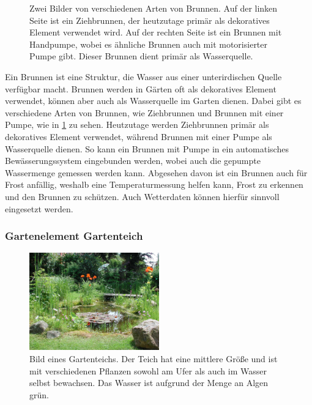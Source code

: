 \begin{figure}[!htb]
	\caption[Bilder von verschiedenen Arten von Brunnen.]{
		Zwei Bilder von verschiedenen Arten von Brunnen.
		Auf der linken Seite ist ein Ziehbrunnen, der heutzutage primär als dekoratives Element verwendet wird.
		Auf der rechten Seite ist ein Brunnen mit Handpumpe, wobei es ähnliche Brunnen auch mit motorisierter Pumpe gibt.
		Dieser Brunnen dient primär als Wasserquelle.\footnotemark
	}
	\label{pic:brunnen}
\end{figure}

Ein Brunnen ist eine Struktur, die Wasser aus einer unterirdischen Quelle verfügbar macht.
Brunnen werden in Gärten oft als dekoratives Element verwendet, können aber auch als Wasserquelle im Garten dienen.
Dabei gibt es verschiedene Arten von Brunnen, wie Ziehbrunnen und Brunnen mit einer Pumpe, wie in \cref{pic:brunnen} zu sehen.
Heutzutage werden Ziehbrunnen primär als dekoratives Element verwendet, während Brunnen mit einer Pumpe als Wasserquelle dienen.
So kann ein Brunnen mit Pumpe in ein automatisches Bewässerungssystem eingebunden werden, wobei auch die gepumpte Wassermenge gemessen werden kann.
Abgesehen davon ist ein Brunnen auch für Frost anfällig, weshalb eine Temperaturmessung helfen kann, Frost zu erkennen und den Brunnen zu schützen.
Auch Wetterdaten können hierfür sinnvoll eingesetzt werden.

\subsubsection{Gartenelement Gartenteich}
\begin{figure}[!htb]
	\centering
	\includegraphics[width=0.5\textwidth]{images/Gartenteich.jpg}
	\caption[Bild eines Gartenteichs.]{
		Bild eines Gartenteichs.
		Der Teich hat eine mittlere Größe und ist mit verschiedenen Pflanzen sowohl am Ufer als auch im Wasser selbst bewachsen.
		Das Wasser ist aufgrund der Menge an Algen grün.\footnotemark
	}
	\label{pic:gartenteich}
\end{figure}

